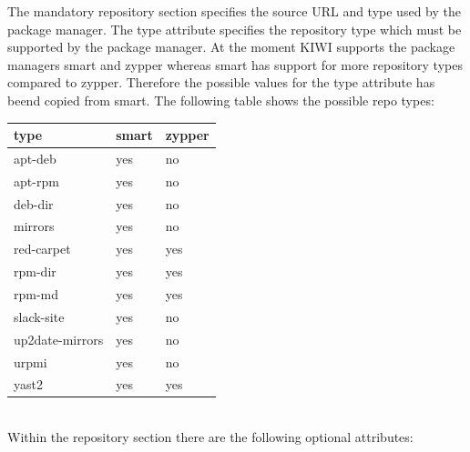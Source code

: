 The mandatory repository section specifies the source URL and
type used by the package manager. The type attribute specifies the
repository type which must be supported by the package manager.
At the moment KIWI supports the package managers smart and zypper
whereas smart has support for more repository types compared to
zypper. Therefore the possible values for the type attribute has
beend copied from smart. The following table shows the possible
repo types:\\ 

\begin{tabular}[h]{|p{4cm}|p{2cm}|p{2cm}|}
\hline
\textbf{type} & \textbf{smart} & \textbf{zypper} \\
\hline
apt-deb            & yes & no  \\
apt-rpm            & yes & no  \\
deb-dir            & yes & no  \\
mirrors            & yes & no  \\
red-carpet         & yes & yes \\
rpm-dir            & yes & yes \\
rpm-md             & yes & yes \\ 
slack-site         & yes & no  \\
up2date-mirrors    & yes & no  \\
urpmi              & yes & no  \\
yast2              & yes & yes \\
\hline
\end{tabular}\\

Within the repository section there are the following optional
attributes:

